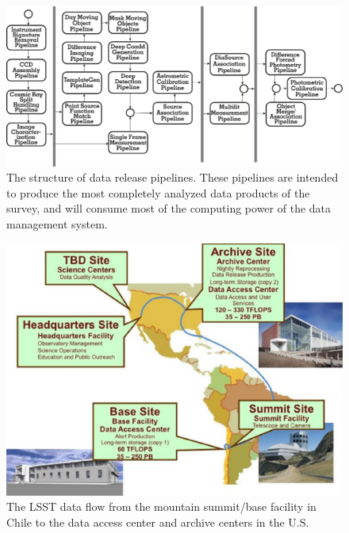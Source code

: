 \documentclass{emulateapj}
\begin{document}
\begin{figure}[t!]
\hskip 0.3in
\includegraphics[width=0.92\hsize,clip]{DMp3.ps}
\caption{The structure of data release pipelines.
These pipelines are intended to produce the most completely analyzed data products 
of the survey, and will consume most of the computing power of the data management 
system.} 
\label{Fig:DM6}
\end{figure}


\begin{figure}
\hskip 0.5in
\includegraphics[width=0.9\hsize,clip]{DMX2.ps}
\caption{The LSST data flow from the mountain summit/base facility in
Chile to the data access center and archive centers in the U.S.} 
\label{Fig:DM2}
\end{figure}
\end{document}
